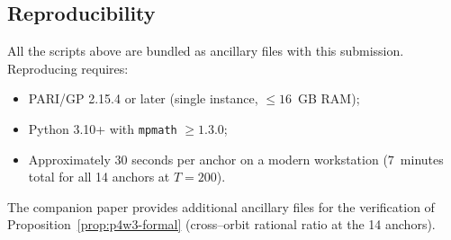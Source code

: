 \documentclass[11pt]{amsart}
\theoremstyle{definition}
\theoremstyle{remark}
\begin{document}
\subsection{Reproducibility}\label{ssec:reproducibility}
All the scripts above are bundled as ancillary files with this
submission. Reproducing  requires:
\begin{itemize}
  \item PARI/GP 2.15.4 or later (single instance, \(\le 16\)~GB RAM);
  \item Python 3.10+ with \texttt{mpmath} \(\ge 1.3.0\);
  \item Approximately \(30\) seconds per anchor on a modern workstation
  (\(7\)~minutes total for all 14 anchors at \(T = 200\)).
\end{itemize}
The companion paper \cite{Remondiere2026bsd} provides additional
ancillary files for the verification of
Proposition~\ref{prop:p4w3-formal} (cross--orbit rational ratio at
the 14 anchors).
\end{document}
